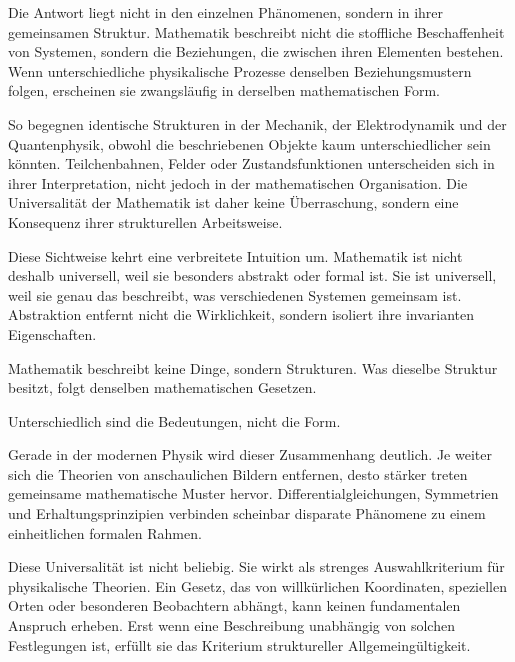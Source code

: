 Die Antwort liegt nicht in den einzelnen Phänomenen, sondern in ihrer gemeinsamen Struktur. Mathematik beschreibt nicht die stoffliche Beschaffenheit von Systemen, sondern die Beziehungen, die zwischen ihren Elementen bestehen. Wenn unterschiedliche physikalische Prozesse denselben Beziehungsmustern folgen, erscheinen sie zwangsläufig in derselben mathematischen Form.

So begegnen identische Strukturen in der Mechanik, der Elektrodynamik und der Quantenphysik, obwohl die beschriebenen Objekte kaum unterschiedlicher sein könnten. Teilchenbahnen, Felder oder Zustandsfunktionen unterscheiden sich in ihrer Interpretation, nicht jedoch in der mathematischen Organisation. Die Universalität der Mathematik ist daher keine Überraschung, sondern eine Konsequenz ihrer strukturellen Arbeitsweise.

Diese Sichtweise kehrt eine verbreitete Intuition um. Mathematik ist nicht deshalb universell, weil sie besonders abstrakt oder formal ist. Sie ist universell, weil sie genau das beschreibt, was verschiedenen Systemen gemeinsam ist. Abstraktion entfernt nicht die Wirklichkeit, sondern isoliert ihre invarianten Eigenschaften.

\begin{DidacticBox}
	\label{box:matheuniversell}
	Mathematik beschreibt keine Dinge, sondern Strukturen.  
	Was dieselbe Struktur besitzt, folgt denselben mathematischen Gesetzen.
	
	Unterschiedlich sind die Bedeutungen,  
	nicht die Form.
\end{DidacticBox}

Gerade in der modernen Physik wird dieser Zusammenhang deutlich. Je weiter sich die Theorien von anschaulichen Bildern entfernen, desto stärker treten gemeinsame mathematische Muster hervor. Differentialgleichungen, Symmetrien und Erhaltungsprinzipien verbinden scheinbar disparate Phänomene zu einem einheitlichen formalen Rahmen.

Diese Universalität ist nicht beliebig. Sie wirkt als strenges Auswahlkriterium für physikalische Theorien. Ein Gesetz, das von willkürlichen Koordinaten, speziellen Orten oder besonderen Beobachtern abhängt, kann keinen fundamentalen Anspruch erheben. Erst wenn eine Beschreibung unabhängig von solchen Festlegungen ist, erfüllt sie das Kriterium struktureller Allgemeingültigkeit.


